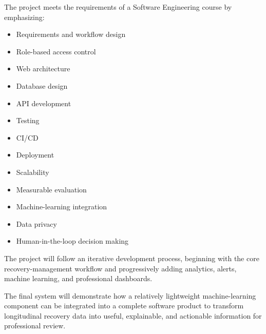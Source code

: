 \documentclass[11pt,a4paper]{article}
\begin{document}
The project meets the requirements of a Software Engineering
course by emphasizing:
\begin{itemize}[leftmargin=0.7cm]
    \item Requirements and workflow design
    \item Role-based access control
    \item Web architecture
    \item Database design
    \item API development
    \item Testing
    \item CI/CD
    \item Deployment
    \item Scalability
    \item Measurable evaluation
    \item Machine-learning integration
    \item Data privacy
    \item Human-in-the-loop decision making
\end{itemize}

The project will follow an iterative development process,
beginning with the core recovery-management workflow and progressively adding
analytics, alerts, machine learning, and professional dashboards.

The final system will demonstrate how a relatively
lightweight machine-learning component can be integrated into a complete
software product to transform longitudinal recovery data into useful,
explainable, and actionable information for professional review.
\end{document}
